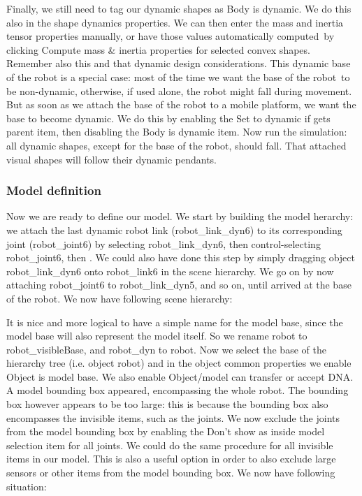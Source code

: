 Finally, we still need to tag our dynamic shapes as Body is dynamic. We do 
this also in the shape dynamics properties. We can then enter the mass and 
inertia tensor properties manually, or have those values automatically 
computed\ by clicking Compute mass \& inertia properties for 
selected convex shapes. Remember also this and that dynamic design 
considerations. This dynamic base of the robot is a special case: most of the
time we want the base of the robot\ to be
non-dynamic, otherwise, if used alone, the robot might 
fall during movement. But 
as soon as we attach the base of the robot to a mobile platform, we want the 
base to become dynamic. We do this by enabling the Set to 
dynamic if gets parent item, then disabling the Body is dynamic item. Now run 
the simulation: all dynamic shapes, except for the base of the robot, should 
fall. That attached visual shapes will follow their dynamic pendants.

\subsubsection{Model definition}

Now we are ready to define our model. We start by building the model herarchy: 
we attach the last dynamic robot link (robot\_link\_dyn6) to its corresponding 
joint (robot\_joint6) by selecting robot\_link\_dyn6, then control-selecting
robot\_joint6, then
. 
We could also have done this step by simply dragging object robot\_link\_dyn6 
onto robot\_link6 in the scene hierarchy. We go on by now attaching robot\_joint6
to robot\_link\_dyn5, and so on, until arrived at the base of the robot. We now
have following scene hierarchy:


It is nice and more logical to have a simple name for the model base, since 
the model base will also represent the model itself. So we rename robot to 
robot\_visibleBase, and robot\_dyn to robot. Now we select the base of the 
hierarchy tree (i.e. object robot) and in the object common properties we 
enable Object is model base. We also enable Object/model can transfer or 
accept DNA. A model bounding box appeared, encompassing the whole robot. The 
bounding box however appears to be too large: this is because the bounding 
box also encompasses the invisible items, such as the joints. We now exclude 
the joints from the model bounding box by enabling the Don't show as inside 
model selection item for all joints. We could do the same procedure for all 
invisible items in our model. This is also a useful option in order to also 
exclude large sensors or other items from the model bounding box. We now have 
following situation:

